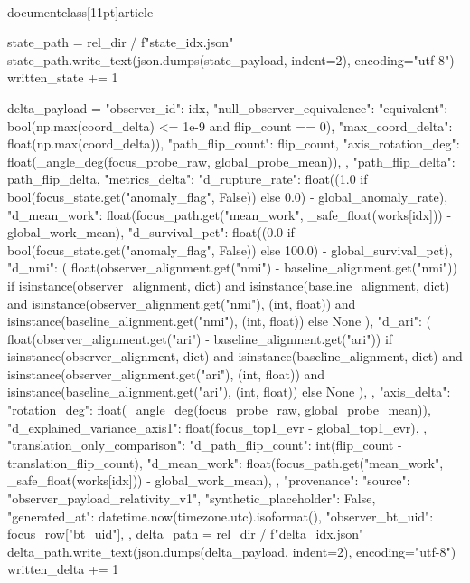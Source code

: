 \\documentclass[11pt]{article}
\begin{document}
\begin{CodeBlock}
        state_path = rel_dir / f"state_{idx}.json"
        state_path.write_text(json.dumps(state_payload, indent=2), encoding="utf-8")
        written_state += 1

        delta_payload = {
            "observer_id": idx,
            "null_observer_equivalence": {
                "equivalent": bool(np.max(coord_delta) <= 1e-9 and flip_count == 0),
                "max_coord_delta": float(np.max(coord_delta)),
                "path_flip_count": flip_count,
                "axis_rotation_deg": float(_angle_deg(focus_probe_raw, global_probe_mean)),
            },
            "path_flip_delta": path_flip_delta,
            "metrics_delta": {
                "d_rupture_rate": float((1.0 if bool(focus_state.get("anomaly_flag", False)) else 0.0) - global_anomaly_rate),
                "d_mean_work": float(focus_path.get("mean_work", _safe_float(works[idx])) - global_work_mean),
                "d_survival_pct": float((0.0 if bool(focus_state.get("anomaly_flag", False)) else 100.0) - global_survival_pct),
                "d_nmi": (
                    float(observer_alignment.get("nmi") - baseline_alignment.get("nmi"))
                    if isinstance(observer_alignment, dict)
                    and isinstance(baseline_alignment, dict)
                    and isinstance(observer_alignment.get("nmi"), (int, float))
                    and isinstance(baseline_alignment.get("nmi"), (int, float))
                    else None
                ),
                "d_ari": (
                    float(observer_alignment.get("ari") - baseline_alignment.get("ari"))
                    if isinstance(observer_alignment, dict)
                    and isinstance(baseline_alignment, dict)
                    and isinstance(observer_alignment.get("ari"), (int, float))
                    and isinstance(baseline_alignment.get("ari"), (int, float))
                    else None
                ),
            },
            "axis_delta": {
                "rotation_deg": float(_angle_deg(focus_probe_raw, global_probe_mean)),
                "d_explained_variance_axis1": float(focus_top1_evr - global_top1_evr),
            },
            "translation_only_comparison": {
                "d_path_flip_count": int(flip_count - translation_flip_count),
                "d_mean_work": float(focus_path.get("mean_work", _safe_float(works[idx])) - global_work_mean),
            },
            "provenance": {
                "source": "observer_payload_relativity_v1",
                "synthetic_placeholder": False,
                "generated_at": datetime.now(timezone.utc).isoformat(),
                "observer_bt_uid": focus_row["bt_uid"],
            },
        }
        delta_path = rel_dir / f"delta_{idx}.json"
        delta_path.write_text(json.dumps(delta_payload, indent=2), encoding="utf-8")
        written_delta += 1


\end{CodeBlock}
\end{document}
